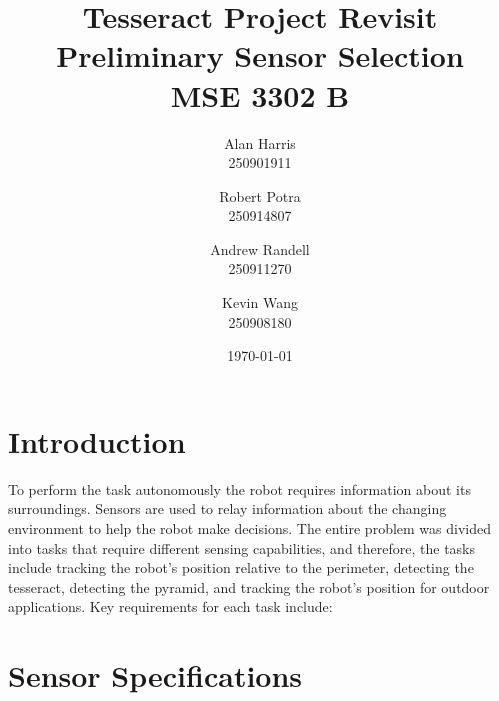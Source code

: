 \documentclass[12pt]{article}
\begin{document}
\title{\textbf{Tesseract Project Revisit\\Preliminary Sensor Selection\\ MSE 3302 B}}
\author{
  Alan Harris\\
  250901911
  \and
  Robert Potra\\
  250914807
  \and
  Andrew Randell\\
  250911270
  \and
  Kevin Wang\\
  250908180
}
\date{\today}
\maketitle

\tableofcontents
\thispagestyle{empty}

\pagebreak
\setcounter{page}{1}

\section{Introduction}

To perform the task autonomously the robot requires information about its surroundings. Sensors are used to relay information about the changing environment to help the robot make decisions. The entire problem was divided into tasks that require different sensing capabilities, and therefore, the tasks include tracking the robot's position relative to the perimeter, detecting the tesseract, detecting the pyramid, and tracking the robot's position for outdoor applications. Key requirements for each task include:

\section{Sensor Specifications}
\end{document}
